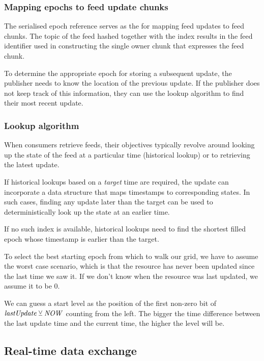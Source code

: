 \subsubsection{Mapping epochs to feed update chunks}

The serialised epoch reference serves as the  for mapping feed updates to feed chunks. The topic of the feed hashed together with the index results in the feed identifier used in constructing the single owner chunk that expresses the feed chunk. 

To determine the appropriate epoch for storing a subsequent update, the publisher needs to know the location of the previous update. If the publisher does not keep track of this information, they can use the lookup algorithm to find their most recent update.



\subsubsection{Lookup algorithm}

When consumers retrieve feeds, their objectives typically revolve around looking up the state of the feed at a particular time (historical lookup) or to retrieving the latest update.

If historical lookups based on a \emph{target} time are required, the update can incorporate a data structure that maps timestamps to corresponding states. In such cases, finding any update later than the target can be used to deterministically look up the state at an earlier time. 

If no such index is available, historical lookups need to find the shortest filled epoch whose timestamp is earlier than the target. 

To select the best starting epoch from which to walk our grid, we have to assume the worst case scenario, which is that the resource has never been updated since the last time we saw it. If we don't know when the resource was last updated, we assume it to be 0.

We can guess a start level as the position of the first non-zero bit of $\mathit{lastUpdate}\veebar \mathit{NOW}$ counting from the left. The bigger the time difference between the last update time and the current time, the higher the level will be.


\subsection{Real-time data exchange \statusyellow}\label{sec:feed-as-channel}

